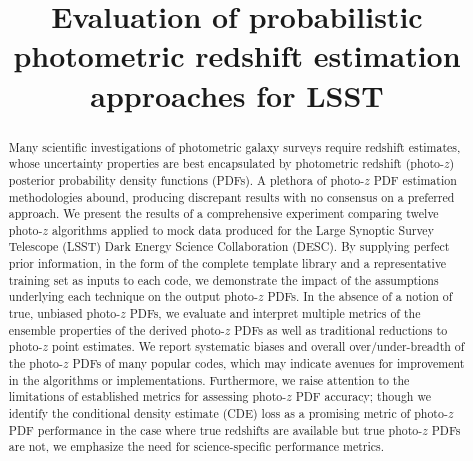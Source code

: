 \documentclass[\docopts]{\docclass}
\begin{document}

\title[Photo-z estimation approaches for LSST]{Evaluation of probabilistic photometric redshift estimation approaches for \textsc{LSST}}

\maketitlepre

\begin{abstract}

Many scientific investigations of photometric galaxy surveys require redshift estimates, whose uncertainty properties are best encapsulated by photometric redshift (photo-$z$) posterior probability density functions (PDFs).
A plethora of photo-$z$ PDF estimation methodologies abound, producing discrepant results with no consensus on a preferred approach.
We present the results of a comprehensive experiment comparing twelve photo-$z$ algorithms applied to mock data produced for the Large Synoptic Survey Telescope (\textsc{LSST}) Dark Energy Science Collaboration (\textsc{DESC}).
By supplying perfect prior information, in the form of the complete template library and a representative training set as inputs to each code, we demonstrate the impact of the assumptions underlying each technique on the output photo-$z$ PDFs.
In the absence of a notion of true, unbiased photo-$z$ PDFs, we evaluate and interpret multiple metrics of the ensemble properties of the derived photo-$z$ PDFs as well as traditional reductions to photo-$z$ point estimates.
We report systematic biases and overall over/under-breadth of the photo-$z$ PDFs of many popular codes, which may indicate avenues for improvement in the algorithms or implementations.
Furthermore, we raise attention to the limitations of established metrics for assessing photo-$z$ PDF accuracy; though we identify the conditional density estimate (CDE) loss as a promising metric of photo-$z$ PDF performance in the case where true redshifts are available but true photo-$z$ PDFs are not, we emphasize the need for science-specific performance metrics.

\end{abstract}


\maketitlepost





\end{document}
